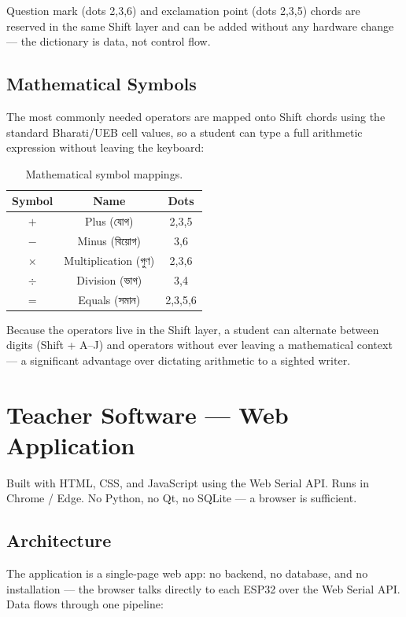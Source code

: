 \documentclass[11pt,a4paper,twoside]{article}
\newcommand{\bengali}[1]{#1}
\begin{document}
Question mark (dots 2,3,6) and exclamation point (dots 2,3,5) chords
are reserved in the same Shift layer and can be added without any
hardware change --- the dictionary is data, not control flow.

\subsection{Mathematical Symbols}
The most commonly needed operators are mapped onto Shift chords using
the standard Bharati/UEB cell values, so a student can type a full
arithmetic expression without leaving the keyboard:

\begin{table}[H]\centering
\caption{Mathematical symbol mappings.}\label{tab:math-symbols}
\begin{tabular}{c c c}\toprule
\textbf{Symbol} & \textbf{Name} & \textbf{Dots} \\\midrule
$+$ & Plus (\bengali{যোগ}) & 2,3,5 \\
$-$ & Minus (\bengali{বিয়োগ}) & 3,6 \\
$\times$ & Multiplication (\bengali{গুণ}) & 2,3,6 \\
$\div$ & Division (\bengali{ভাগ}) & 3,4 \\
$=$ & Equals (\bengali{সমান}) & 2,3,5,6 \\\bottomrule
\end{tabular}\end{table}

Because the operators live in the Shift layer, a student can alternate
between digits (Shift + A--J) and operators without ever leaving a
mathematical context --- a significant advantage over dictating
arithmetic to a sighted writer.

\section{Teacher Software --- Web Application}

Built with HTML, CSS, and JavaScript using the Web Serial API. Runs in
Chrome / Edge. No Python, no Qt, no SQLite --- a browser is sufficient.

\subsection{Architecture}
The application is a single-page web app: no backend, no database, and
no installation --- the browser talks directly to each ESP32 over the
Web Serial API. Data flows through one pipeline:
\end{document}
